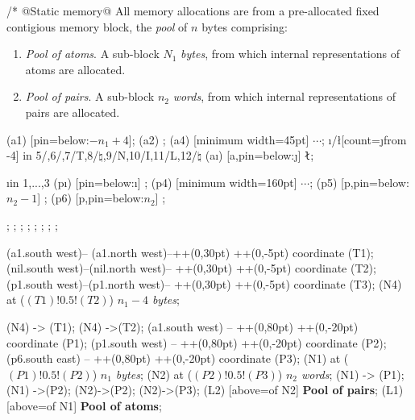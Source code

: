 \documentclass[12pt]{article}
\newenvironment{layout}{\quote\tikzpicture[start chain=going right,x=13pt,y=13pt]\scriptsize}
                       {\endtikzpicture\endquote}
\begin{document}
\begin{code}[literate=
    {*}{$\times$}{1}
    {=}{$\equiv$ }{1}{*}{$\times$}{1}
    {1<<13}{$2^{13}$}{3}
    {1<<15}{$2^{15}$}{3}
    {1a<<$H_x$}{$2^{H_x}$}{3}
]
/* @Static memory@ 
All memory allocations are from a pre-allocated fixed 
contigious memory block, the \emph{pool} of $n$ bytes comprising:
\begin{enumerate} 
\item \emph{Pool of atoms}. A sub-block $N_1$ \emph{bytes}, from which 
internal representations of atoms are allocated. 
\item \emph{Pool of pairs}. A sub-block $n_2$ \emph{words},
from which internal representations of pairs are allocated. 
\end{enumerate}

\begin{layout}
\node[a] (a1) [pin=below:$-n_1+4$]{};
\node[a] (a2) {};
\node[a] (a4) [minimum width=45pt] {$\cdots$};
\foreach \i/\l[count=\j from -4] in {5/,6/,7/T,8/$\natural$,9/N,10/I,11/L,12/$\natural$} \node (a\i) [a,pin=below:{\j}] {\tt\l};

\foreach \i in {1,...,3} \node[p] (p\i) [pin=below:{\i}] {};
\node[p] (p4) [minimum width=160pt] {$\cdots$};
\node[p] (p5) [p,pin=below:{$n_2-1$}] {};
\node[p] (p6) [p,pin=below:{$n_2$}] {};

;
;
\node[p,draw,fill=olive!30,above=of p1,pin=above:1] {};
\node[p,draw,fill=olive!30,above=of p2,pin=above:2] {};
\node[p,draw,fill=olive!30,above=of p3,pin=above:2] {};
\node[p,draw,fill=olive!30,above=of p4,minimum width=160pt] {};
\node[p,draw,fill=olive!30,above=of p5,pin=above:$n_2-1$] {};
\node[p,draw,fill=olive!30,above=of p6,pin=above:$n_2$] {};

 (a1.south west)-- (a1.north west)--++(0,30pt) ++(0,-5pt) coordinate (T1);
 (nil.south west)--(nil.north west)-- ++(0,30pt) ++(0,-5pt) coordinate (T2);
 (p1.south west)--(p1.north west)-- ++(0,30pt) ++(0,-5pt) coordinate (T3);
\node (N4) at ($(T1)!0.5!(T2)$) {\it$n_1-4$ bytes};

\draw[m] (N4) -> (T1);
\draw[m] (N4) ->(T2);
 (a1.south west) -- ++(0,80pt) ++(0,-20pt) coordinate (P1);
 (p1.south west) -- ++(0,80pt) ++(0,-20pt) coordinate (P2);
 (p6.south east) -- ++(0,80pt) ++(0,-20pt) coordinate (P3);
\node (N1) at ($(P1)!0.5!(P2)$) {\it$n_1$ bytes};
\node (N2) at ($(P2)!0.5!(P3)$) {\it$n_2$ words};
\draw[m] (N1) -> (P1);
\draw[m] (N1) ->(P2);
\draw[m] (N2)->(P2);
\draw[m] (N2)->(P3); 
\node(L2) [above=of N2]  {\bf Pool of pairs}; 
\node(L1) [above=of N1]  {\bf Pool of atoms}; 


\end{layout}
\end{code}
\end{document}
